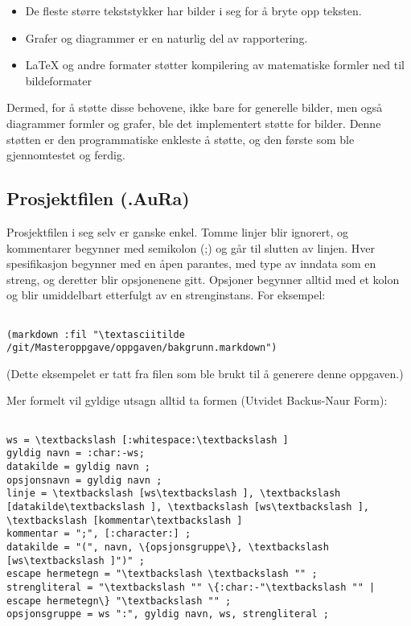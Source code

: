 \documentclass[11pt]{article}
\begin{document}
\begin{itemize}
\item De fleste større tekststykker har bilder i seg for å bryte opp teksten.
\item Grafer og diagrammer er en naturlig del av rapportering.
\item LaTeX og andre formater støtter kompilering av matematiske formler ned til bildeformater
\end{itemize}




Dermed, for å støtte disse behovene, ikke bare for generelle bilder, men også diagrammer formler og grafer, ble det implementert støtte for bilder. Denne støtten er den programmatiske enkleste å støtte, og den første som ble gjennomtestet og ferdig.



\subsection{Prosjektfilen (.AuRa)}



Prosjektfilen i seg selv er ganske enkel. Tomme linjer blir ignorert, og kommentarer begynner med semikolon (;) og går til slutten av linjen.
Hver spesifikasjon begynner med en åpen parantes, med type av inndata som en streng, og deretter blir opsjonenene gitt. Opsjoner begynner alltid med et kolon og blir umiddelbart etterfulgt av en strenginstans. For eksempel:




\begin{lstlisting}

(markdown :fil "\textasciitilde /git/Masteroppgave/oppgaven/bakgrunn.markdown")
\end{lstlisting}




(Dette eksempelet er tatt fra filen som ble brukt til å generere denne oppgaven.)



Mer formelt vil gyldige utsagn alltid ta formen (Utvidet Backus-Naur Form):

\begin{lstlisting}

ws = \textbackslash [:whitespace:\textbackslash ]
gyldig navn = :char:-ws;
datakilde = gyldig navn ;
opsjonsnavn = gyldig navn ;
linje = \textbackslash [ws\textbackslash ], \textbackslash [datakilde\textbackslash ], \textbackslash [ws\textbackslash ], \textbackslash [kommentar\textbackslash ]
kommentar = ";", [:character:] ;
datakilde = "(", navn, \{opsjonsgruppe\}, \textbackslash [ws\textbackslash ]")" ;
escape hermetegn = "\textbackslash \textbackslash "" ;
strengliteral = "\textbackslash "" \{:char:-"\textbackslash "" | escape hermetegn\} "\textbackslash "" ;
opsjonsgruppe = ws ":", gyldig navn, ws, strengliteral ;
\end{lstlisting}
\end{document}
